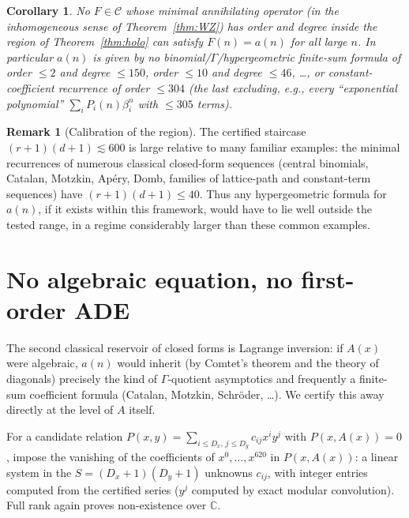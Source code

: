 \documentclass[11pt]{article}
\newtheorem{corollary}[theorem]{Corollary}
\theoremstyle{definition}
\newtheorem{remark}[theorem]{Remark}
\newcommand{\CC}{\mathbb{C}}
\begin{document}
\begin{corollary}\label{cor:noWZ}
No $F\in\mathcal{C}$ whose minimal annihilating operator (in the inhomogeneous
sense of Theorem~\ref{thm:WZ}) has order and degree inside the region of
Theorem~\ref{thm:holo} can satisfy $F(n)=a(n)$ for all large $n$. In particular
$a(n)$ is given by no binomial/$\Gamma$/hypergeometric finite-sum formula of
order $\le 2$ and degree $\le 150$, order $\le 10$ and degree $\le 46$, \dots,
or constant-coefficient recurrence of order $\le 304$ (the last excluding, e.g.,
every ``exponential polynomial'' $\sum_i P_i(n)\beta_i^n$ with $\le 305$ terms).
\end{corollary}

\begin{remark}[Calibration of the region]
The certified staircase $(r+1)(d+1)\lesssim 600$ is large relative to many
familiar examples: the minimal recurrences of numerous classical closed-form
sequences (central binomials, Catalan, Motzkin, Ap\'ery, Domb, families of
lattice-path and constant-term sequences) have $(r+1)(d+1)\le 40$. Thus any
hypergeometric formula for $a(n)$, if it exists within this framework, would
have to lie well outside the tested range, in a regime considerably larger than
these common examples.
\end{remark}

\section{No algebraic equation, no first-order ADE}\label{sec:alg}

The second classical reservoir of closed forms is Lagrange inversion: if
$A(x)$ were algebraic, $a(n)$ would inherit (by Comtet's theorem
\cite{Comtet1964} and the theory of diagonals) precisely the kind of
$\Gamma$-quotient asymptotics and frequently a finite-sum coefficient formula
(Catalan, Motzkin, Schr\"oder, \dots). We certify this away directly at the
level of $A$ itself.

For a candidate relation $P(x,y)=\sum_{i\le D_x,\,j\le D_y}c_{ij}x^iy^j$ with
$P(x,A(x))=0$, impose the vanishing of the coefficients of
$x^0,\dots,x^{620}$ in $P(x,A(x))$: a linear system in the
$S=(D_x+1)(D_y+1)$ unknowns $c_{ij}$, with integer entries computed from the
certified series ($y^j$ computed by exact modular convolution). Full rank again
proves non-existence over $\CC$.
\end{document}
